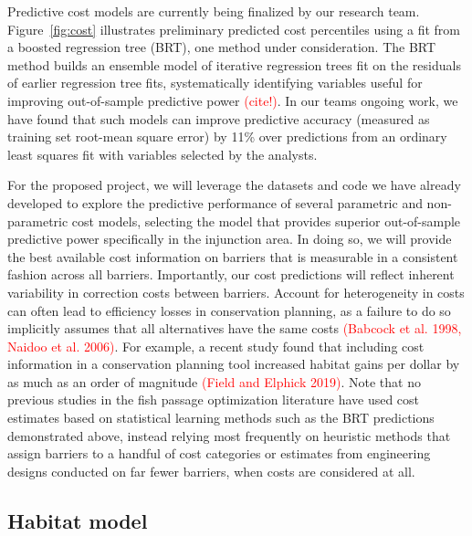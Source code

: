 \documentclass[12pt]{elsarticle}
\begin{document}
Predictive cost models are currently being finalized by our research team. Figure~\ref{fig:cost} illustrates preliminary predicted cost percentiles using a fit from a boosted regression tree (BRT), one method under consideration. The BRT method builds an ensemble model of iterative regression trees fit on the residuals of earlier regression tree fits, systematically identifying variables useful for improving out-of-sample predictive power \textcolor{red}{(cite!)}. In our teams ongoing work, we have found that such models can improve predictive accuracy (measured as training set root-mean square error) by 11\% over predictions from an ordinary least squares fit with variables selected by the analysts. 

For the proposed project, we will leverage the datasets and code we have already developed to explore the predictive performance of several parametric and non-parametric cost models, selecting the model that provides superior out-of-sample predictive power specifically in the injunction area. In doing so, we will provide the best available cost information on barriers that is measurable in a consistent fashion across all barriers. Importantly, our cost predictions will reflect inherent variability in correction costs between barriers. Account for heterogeneity in costs can often lead to efficiency losses in conservation planning, as a failure to do so implicitly assumes that all alternatives have the same costs \textcolor{red}{(Babcock et al. 1998, Naidoo et al. 2006)}. For example, a recent study found that including cost information in a conservation planning tool increased habitat gains per dollar by as much as an order of magnitude \textcolor{red}{(Field and Elphick 2019)}. Note that no previous studies in the fish passage optimization literature have used cost estimates based on statistical learning methods such as the BRT predictions demonstrated above, instead relying most frequently on heuristic methods that assign barriers to a handful of cost categories or estimates from engineering designs conducted on far fewer barriers, when costs are considered at all. 

\subsection{Habitat model}
\end{document}
